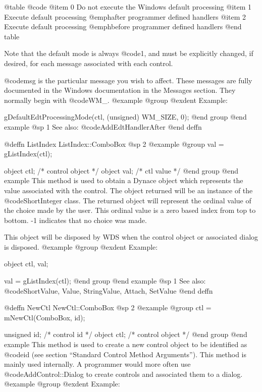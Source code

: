 @table @code
@item 0
Do not execute the Windows default processing
@item 1
Execute default processing @emph{after} programmer defined handlers
@item 2
Execute default processing @emph{before} programmer defined handlers
@end table

Note that the default mode is always @code{1}, and must be explicitly
changed, if desired, for each message associated with each control.

@code{msg} is the particular message you wish to affect.  These messages
are fully documented in the Windows documentation in the Messages
section.  They normally begin with @code{WM_}.
@example
@group
@exdent Example:

gDefaultEdtProcessingMode(ctl, (unsigned) WM_SIZE, 0);
@end group
@end example
@sp 1
See also:  @code{AddEdtHandlerAfter}
@end deffn

















@deffn {ListIndex} ListIndex::ComboBox
@sp 2
@example
@group
val = gListIndex(ctl);

object  ctl;   /*  control object  */
object  val;   /*  ctl value       */
@end group
@end example
This method is used to obtain a Dynace object which represents the value
associated with the control.  The object returned will be an instance of
the @code{ShortInteger} class.  The returned object will represent the
ordinal value of the choice made by the user.  This ordinal value is a
zero based index from top to bottom.  -1 indicates that no choice was
made.

This object will be disposed by WDS when the control object or
associated dialog is disposed.
@example
@group
@exdent Example:

object  ctl, val;

val = gListIndex(ctl);
@end group
@end example
@sp 1
See also:  @code{ShortValue, Value, StringValue, Attach, SetValue}
@end deffn




@deffn {NewCtl} NewCtl::ComboBox
@sp 2
@example
@group
ctl = mNewCtl(ComboBox, id);

unsigned  id;   /*  control id      */
object   ctl;   /*  control object  */
@end group
@end example
This method is used to create a new control object to be identified as
@code{id} (see section ``Standard Control Method Arguments'').  This
method is mainly used internally.  A programmer would more often
use @code{AddControl::Dialog} to create controls and associated them
to a dialog.
@example
@group
@exdent Example:

